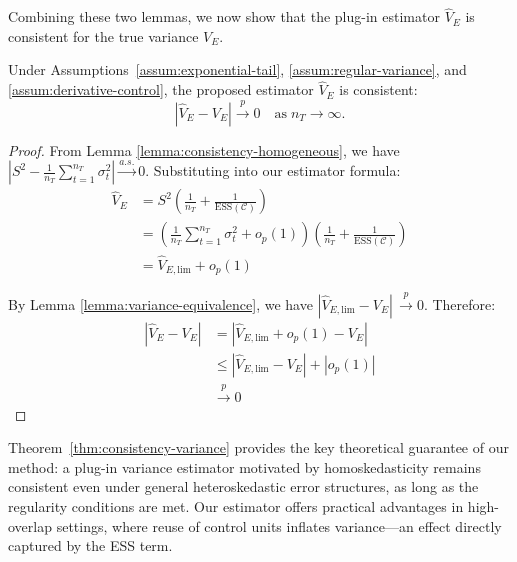 \documentclass{mytemplate}
\begin{document}
Combining these two lemmas, we now show that the plug-in estimator $\hat{V}_E$ is consistent for the true variance $V_E$.

\begin{theorem}
\label{thm:consistency-variance}
Under Assumptions~\ref{assum:exponential-tail}, \ref{assum:regular-variance}, and \ref{assum:derivative-control}, the proposed estimator $\hat{V}_E$ is consistent:
\[
\left|\hat{V}_E - V_E\right| \xrightarrow{p} 0 \quad \text{as} \; n_T \rightarrow \infty.
\]
\end{theorem}

\begin{proof}
From Lemma \ref{lemma:consistency-homogeneous}, we have $\left|S^2 - \frac{1}{n_T} \sum_{t=1}^{n_T} \sigma_t^2\right| \xrightarrow{a.s.} 0$. Substituting into our estimator formula:
\begin{align*}
\hat{V}_E &= S^2 \left( \frac{1}{n_T} + \frac{1}{\text{ESS}(\mathcal{C})} \right) \\
&= \left(\frac{1}{n_T} \sum_{t=1}^{n_T} \sigma_t^2 + o_p(1)\right) \left( \frac{1}{n_T} + \frac{1}{\text{ESS}(\mathcal{C})} \right) \\
&= \hat{V}_{E, \text{lim}} + o_p(1)
\end{align*}

By Lemma \ref{lemma:variance-equivalence}, we have $\left|\hat{V}_{E, \text{lim}}-V_E \right| \, \xrightarrow{p} 0$. Therefore:
\begin{align*}
\left|\hat{V}_E - V_E\right| &= \left|\hat{V}_{E, \text{lim}} + o_p(1) - V_E\right| \\
&\leq \left|\hat{V}_{E, \text{lim}} - V_E\right| + \left|o_p(1)\right| \\
&\xrightarrow{p} 0
\end{align*}
\end{proof}

Theorem~\ref{thm:consistency-variance} provides the key theoretical guarantee of our method: a plug-in variance estimator motivated by homoskedasticity remains consistent even under general heteroskedastic error structures, as long as the regularity conditions are met. Our estimator offers practical advantages in high-overlap settings, where reuse of control units inflates variance—an effect directly captured by the ESS term.
\end{document}
